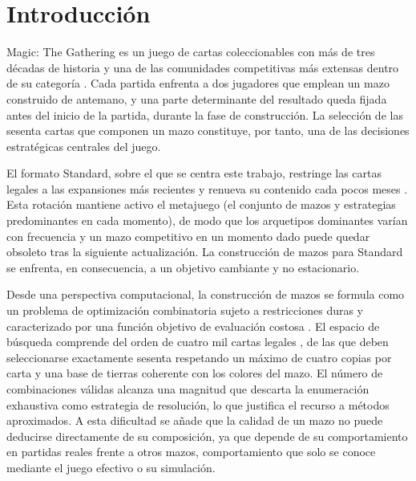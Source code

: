 
\chapter{Introducción}

Magic: The Gathering es un juego de cartas coleccionables con más de tres décadas de historia y una de las comunidades competitivas más extensas dentro de su categoría \cite{guinness}. Cada partida enfrenta a dos jugadores que emplean un mazo construido de antemano, y una parte determinante del resultado queda fijada antes del inicio de la partida, durante la fase de construcción. La selección de las sesenta cartas que componen un mazo constituye, por tanto, una de las decisiones estratégicas centrales del juego.

El formato Standard, sobre el que se centra este trabajo, restringe las cartas legales a las expansiones más recientes y renueva su contenido cada pocos meses \cite{wotc_standard}. Esta rotación mantiene activo el metajuego (el conjunto de mazos y estrategias predominantes en cada momento), de modo que los arquetipos dominantes varían con frecuencia y un mazo competitivo en un momento dado puede quedar obsoleto tras la siguiente actualización. La construcción de mazos para Standard se enfrenta, en consecuencia, a un objetivo cambiante y no estacionario.

Desde una perspectiva computacional, la construcción de mazos se formula como un problema de optimización combinatoria sujeto a restricciones duras y caracterizado por una función objetivo de evaluación costosa \cite{garciasanchez2016, bjorke2017}. El espacio de búsqueda comprende del orden de cuatro mil cartas legales \cite{scryfall}, de las que deben seleccionarse exactamente sesenta respetando un máximo de cuatro copias por carta y una base de tierras coherente con los colores del mazo. El número de combinaciones válidas alcanza una magnitud que descarta la enumeración exhaustiva como estrategia de resolución, lo que justifica el recurso a métodos aproximados. A esta dificultad se añade que la calidad de un mazo no puede deducirse directamente de su composición, ya que depende de su comportamiento en partidas reales frente a otros mazos, comportamiento que solo se conoce mediante el juego efectivo o su simulación.

